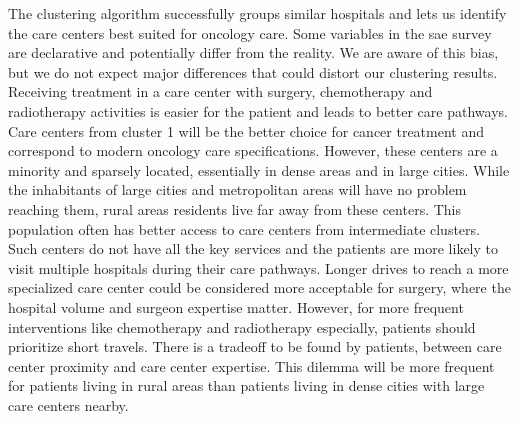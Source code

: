 The clustering algorithm successfully groups similar hospitals and lets us
identify the care centers best suited for oncology care. Some variables in the
\ac{sae} survey are declarative and potentially differ from the reality. We are
aware of this bias, but we do not expect major differences that could distort
our clustering results. Receiving treatment in a care center with surgery,
chemotherapy and radiotherapy activities is easier for the patient and leads to
better care pathways. Care centers from cluster 1 will be the better choice for
cancer treatment and correspond to modern oncology care specifications. However,
these centers are a minority and sparsely located, essentially in dense areas
and in large cities. While the inhabitants of large cities and metropolitan
areas will have no problem reaching them, rural areas residents live far away
from these centers. This population often has better access to care centers from
intermediate clusters. Such centers do not have all the key services and the
patients are more likely to visit multiple hospitals during their care pathways.
Longer drives to reach a more specialized care center could be considered more
acceptable for surgery, where the hospital volume and surgeon expertise matter.
However, for more frequent interventions like chemotherapy and radiotherapy
especially, patients should prioritize short travels. There is a tradeoff to be
found by patients, between care center proximity and care center expertise. This
dilemma will be more frequent for patients living in rural areas than patients
living in dense cities with large care centers nearby.


